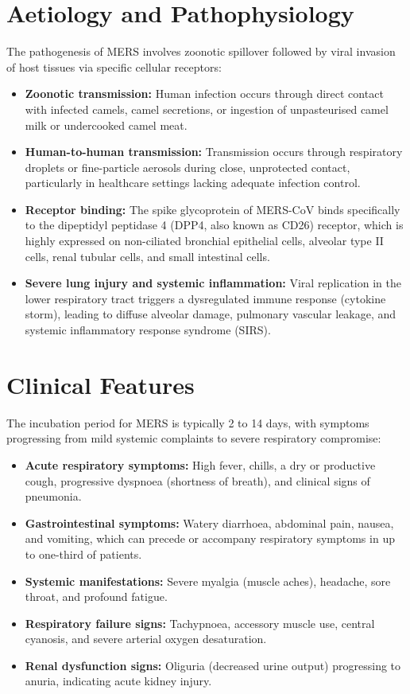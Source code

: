 \section*{Aetiology and Pathophysiology}
The pathogenesis of MERS involves zoonotic spillover followed by viral invasion of host tissues via specific cellular receptors:
\begin{itemize}
    \item \textbf{Zoonotic transmission:} Human infection occurs through direct contact with infected camels, camel secretions, or ingestion of unpasteurised camel milk or undercooked camel meat.
    \item \textbf{Human-to-human transmission:} Transmission occurs through respiratory droplets or fine-particle aerosols during close, unprotected contact, particularly in healthcare settings lacking adequate infection control.
    \item \textbf{Receptor binding:} The spike glycoprotein of MERS-CoV binds specifically to the dipeptidyl peptidase 4 (DPP4, also known as CD26) receptor, which is highly expressed on non-ciliated bronchial epithelial cells, alveolar type II cells, renal tubular cells, and small intestinal cells.
    \item \textbf{Severe lung injury and systemic inflammation:} Viral replication in the lower respiratory tract triggers a dysregulated immune response (cytokine storm), leading to diffuse alveolar damage, pulmonary vascular leakage, and systemic inflammatory response syndrome (SIRS).
\end{itemize}

\section*{Clinical Features}
The incubation period for MERS is typically 2 to 14 days, with symptoms progressing from mild systemic complaints to severe respiratory compromise:
\begin{itemize}
    \item \textbf{Acute respiratory symptoms:} High fever, chills, a dry or productive cough, progressive dyspnoea (shortness of breath), and clinical signs of pneumonia.
    \item \textbf{Gastrointestinal symptoms:} Watery diarrhoea, abdominal pain, nausea, and vomiting, which can precede or accompany respiratory symptoms in up to one-third of patients.
    \item \textbf{Systemic manifestations:} Severe myalgia (muscle aches), headache, sore throat, and profound fatigue.
    \item \textbf{Respiratory failure signs:} Tachypnoea, accessory muscle use, central cyanosis, and severe arterial oxygen desaturation.
    \item \textbf{Renal dysfunction signs:} Oliguria (decreased urine output) progressing to anuria, indicating acute kidney injury.
\end{itemize}

